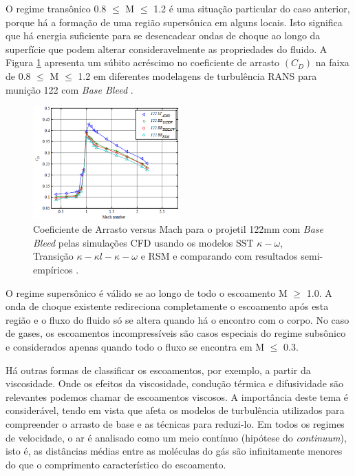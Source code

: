 O regime transônico \num{0,8} \(\leq\) M \(\leq\) \num{1,2} é uma situação particular do caso anterior, porque há a formação de uma região supersônica em alguns locais. Isto significa que há energia suficiente para se desencadear ondas de choque ao longo da superfície que podem alterar consideravelmente as propriedades do fluido. A Figura \ref{fig:dali2018b} apresenta um súbito acréscimo no coeficiente de arrasto \(\left(C_D\right)\) na faixa de \num{0,8} \(\leq\) M \(\leq\) \num{1,2} em diferentes modelagens de turbulência RANS para munição \qty{122}{\millimetre} com \textit{Base Bleed} \cite{Dali2018b}.

\begin{figure}[!ht]
	\centering
    \includegraphics[width=0.5\textwidth]{foto01-dali2018b.png}
	\caption[Coeficiente de Arrasto versus Mach para o projetil 122mm com \textit{Base Bleed} pelas simulações CFD usando os modelos SST \(\kappa-\omega\), Transição \(\kappa-\kappa l-\kappa-\omega\) e RSM e comparando com resultados semi-empíricos.]{Coeficiente de Arrasto versus Mach para o projetil 122mm com \textit{Base Bleed} pelas simulações CFD usando os modelos SST \(\kappa-\omega\), Transição \(\kappa-\kappa l-\kappa-\omega\) e RSM e comparando com resultados semi-empíricos \cite{Dali2018b}.}
	\label{fig:dali2018b}
\end{figure}

O regime supersônico é válido se ao longo de todo o escoamento M \(\geq\) \num{1,0}. A onda de choque existente redireciona completamente o escoamento após esta região e o fluxo do fluido só se altera quando há o encontro com o corpo. No caso de gases, os escoamentos incompressíveis são casos especiais do regime subsônico e considerados apenas quando todo o fluxo se encontra em M \(\leq\) \num{0,3}.

Há outras formas de classificar os escoamentos, por exemplo, a partir da viscosidade. Onde os efeitos da viscosidade, condução térmica e difusividade são relevantes podemos chamar de escoamentos viscosos. A importância deste tema é considerável, tendo em vista que afeta os modelos de turbulência utilizados para compreender o arrasto de base e as técnicas para reduzi-lo. Em todos os regimes de velocidade, o ar é analisado como um meio contínuo (hipótese do \textit{continuum}), isto é, as distâncias médias entre as moléculas do gás são infinitamente menores do que o comprimento característico do escoamento.

